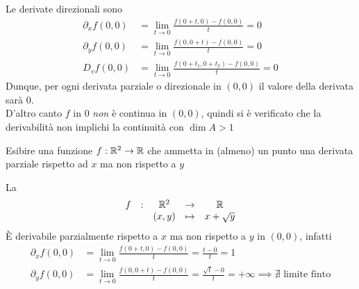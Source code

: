 \begin{exercise}
	\begin{solution}
		Le derivate direzionali sono
		\begin{align*}
			\partial_x f(0,0) &= \lim\limits_{t \to 0} \frac{f(0+t,0)-f(0,0)}{t} = 0\\
			\partial_y f(0,0) &= \lim\limits_{t \to 0} \frac{f(0,0+t)-f(0,0)}{t} = 0\\
			D_v f(0,0) &= \lim\limits_{t \to 0} \frac{f(0+t_1,0+t_2)-f(0,0)}{t} = 0
		\end{align*}
		Dunque, per ogni derivata parziale o direzionale in $(0,0)$ il valore della derivata sarà $0$.\\
		D'altro canto $f$ in $0$ \textit{non} è continua in $(0,0)$, quindi si è verificato che la derivabilità non implichi la continuità con $\dim A > 1$
	\end{solution}
\end{exercise}
\begin{exercise}
	Esibire una funzione $f: \mathbb{R}^2 \to \mathbb{R}$ che ammetta in (almeno) un punto una derivata parziale rispetto ad $x$ ma non rispetto a $y$
	\begin{solution}
		La
		\[\begin{array}{ccccc} {f} & : & {\mathbb{R}^2} & \to & {\mathbb{R}} \\ & & {(x,y)} & \mapsto & {x+\sqrt{y}} \\ \end{array}\]
		È derivabile parzialmente rispetto a $x$ ma non rispetto a $y$ in $(0,0)$, infatti
		\begin{align*}
			\partial_x f(0,0) &= \lim\limits_{t \to 0} \frac{f(0+t,0)-f(0,0)}{t} = \frac{t-0}{t} = 1\\
			\partial_y f(0,0) &= \lim\limits_{t \to 0} \frac{f(0,0+t)-f(0,0)}{t} = \frac{\sqrt{t}-0}{t} = +\infty \implies \nexists \text{ limite finto}
		\end{align*}
	\end{solution}
\end{exercise}

\newpage
